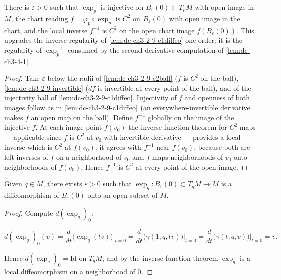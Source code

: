 \begin{lemma}
  \label{lem:dc-ch3-2-9-c2diffeo}
  \leanok
  There is $\varepsilon > 0$ such that $\exp_p$ is injective on
  $B_\varepsilon(0) \subset T_pM$ with open image in $M$, the chart reading
  $f = \varphi_p \circ \exp_p$ is $C^2$ on $B_\varepsilon(0)$ with open image
  in the chart, and the local inverse $f^{-1}$ is $C^2$ on the open chart
  image $f(B_\varepsilon(0))$. This upgrades the inverse-regularity of
  \cref{lem:dc-ch3-2-9-c1diffeo} one order; it is the regularity of
  $\exp_p^{-1}$ consumed by the second-derivative computation of
  \cref{lem:dc-ch3-4-1}.
\end{lemma}
\begin{proof}
  \sketch
  \leanok
  Take $\varepsilon$ below the radii of \cref{lem:dc-ch3-2-9-c2ball} ($f$ is
  $C^2$ on the ball), \cref{lem:dc-ch3-2-9-invertible} ($df$ is invertible at
  every point of the ball), and of the injectivity ball of
  \cref{lem:dc-ch3-2-9-c1diffeo}. Injectivity of $f$ and openness of both
  images follow as in \cref{lem:dc-ch3-2-9-c1diffeo} (an everywhere-invertible
  derivative makes $f$ an open map on the ball). Define $f^{-1}$ globally on
  the image of the injective $f$. At each image point $f(v_0)$ the inverse
  function theorem for $C^2$ maps — applicable since $f$ is $C^2$ at $v_0$
  with invertible derivative — provides a local inverse which is $C^2$ at
  $f(v_0)$; it agrees with $f^{-1}$ near $f(v_0)$, because both are left
  inverses of $f$ on a neighborhood of $v_0$ and $f$ maps neighborhoods of
  $v_0$ onto neighborhoods of $f(v_0)$. Hence $f^{-1}$ is $C^2$ at every
  point of the open image.
\end{proof}

\begin{proposition}
  \label{prop:dc-ch3-2-9}
  \notready
  Given $q\in M$, there exists $\varepsilon>0$ such that
  $\exp_q:B_\varepsilon(0)\subset T_qM\to M$ is a diffeomorphism of
  $B_\varepsilon(0)$ onto an open subset of $M$.
\end{proposition}
\begin{proof}
  \sketch
  Compute $d(\exp_q)_0$:
  
  $$
  d(\exp_q)_0(v)=\frac{d}{dt}\big(\exp_q(tv)\big)\Big|_{t=0}=\frac{d}{dt}\big(\gamma(1,q,tv)\big)\Big|_{t=0}=\frac{d}{dt}\big(\gamma(t,q,v)\big)\Big|_{t=0}=v.
  $$
  
  Hence $d(\exp_q)_0=\mathrm{Id}$ on $T_qM$, and by the inverse function theorem
  $\exp_q$ is a local diffeomorphism on a neighborhood of $0$.
\end{proof}

